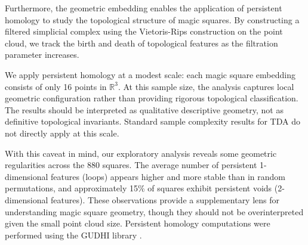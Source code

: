Furthermore, the geometric embedding enables the application of persistent homology to study the topological structure of magic squares. By constructing a filtered simplicial complex using the Vietoris-Rips construction on the point cloud, we track the birth and death of topological features as the filtration parameter increases.

\begin{remark}
We apply persistent homology at a modest scale: each magic square embedding consists of only 16 points in $\mathbb{R}^3$. At this sample size, the analysis captures local geometric configuration rather than providing rigorous topological classification. The results should be interpreted as qualitative descriptive geometry, not as definitive topological invariants. Standard sample complexity results for TDA do not directly apply at this scale.
\end{remark}

With this caveat in mind, our exploratory analysis reveals some geometric regularities across the 880 squares. The average number of persistent 1-dimensional features (loops) appears higher and more stable than in random permutations, and approximately 15\% of squares exhibit persistent voids (2-dimensional features). These observations provide a supplementary lens for understanding magic square geometry, though they should not be overinterpreted given the small point cloud size. Persistent homology computations were performed using the GUDHI library \citep{maria2014gudhi}.
